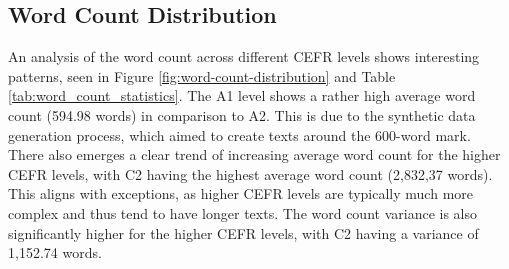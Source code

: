 \subsection*{Word Count Distribution}
\label{ss:word_count_distribution}An analysis of the word count across different CEFR levels shows interesting patterns, seen in Figure \ref{fig:word-count-distribution} and Table \ref{tab:word_count_statistics}. The A1 level shows a rather high average word count (594.98 words) in comparison to A2. This is due to the synthetic data generation process, which aimed to create texts around the 600-word mark. \\
There also emerges a clear trend of increasing average word count for the higher CEFR levels, with C2 having the highest average word count (2,832,37 words). This aligns with exceptions, as higher CEFR levels are typically much more complex and thus tend to have longer texts. The word count variance is also significantly higher for the higher CEFR levels, with C2 having a variance of 1,152.74 words.

